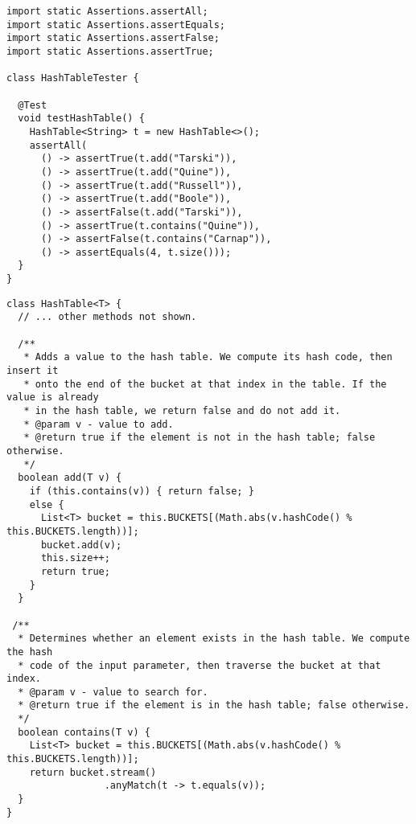 \begin{lstlisting}[language=MyJava]
import static Assertions.assertAll;
import static Assertions.assertEquals;
import static Assertions.assertFalse;
import static Assertions.assertTrue;

class HashTableTester {

  @Test
  void testHashTable() {
    HashTable<String> t = new HashTable<>();
    assertAll(
      () -> assertTrue(t.add("Tarski")),
      () -> assertTrue(t.add("Quine")),
      () -> assertTrue(t.add("Russell")),
      () -> assertTrue(t.add("Boole")),
      () -> assertFalse(t.add("Tarski")),
      () -> assertTrue(t.contains("Quine")),
      () -> assertFalse(t.contains("Carnap")),
      () -> assertEquals(4, t.size()));
  }
}
\end{lstlisting}

\begin{lstlisting}[language=MyJava]
class HashTable<T> {
  // ... other methods not shown.

  /**
   * Adds a value to the hash table. We compute its hash code, then insert it
   * onto the end of the bucket at that index in the table. If the value is already
   * in the hash table, we return false and do not add it.
   * @param v - value to add.
   * @return true if the element is not in the hash table; false otherwise.
   */
  boolean add(T v) {
    if (this.contains(v)) { return false; } 
    else {
      List<T> bucket = this.BUCKETS[(Math.abs(v.hashCode() % this.BUCKETS.length))];
      bucket.add(v);
      this.size++;
      return true;
    }
  }

 /**
  * Determines whether an element exists in the hash table. We compute the hash
  * code of the input parameter, then traverse the bucket at that index.
  * @param v - value to search for.
  * @return true if the element is in the hash table; false otherwise.
  */
  boolean contains(T v) {
    List<T> bucket = this.BUCKETS[(Math.abs(v.hashCode() % this.BUCKETS.length))];
    return bucket.stream()
                 .anyMatch(t -> t.equals(v));
  }
}
\end{lstlisting}